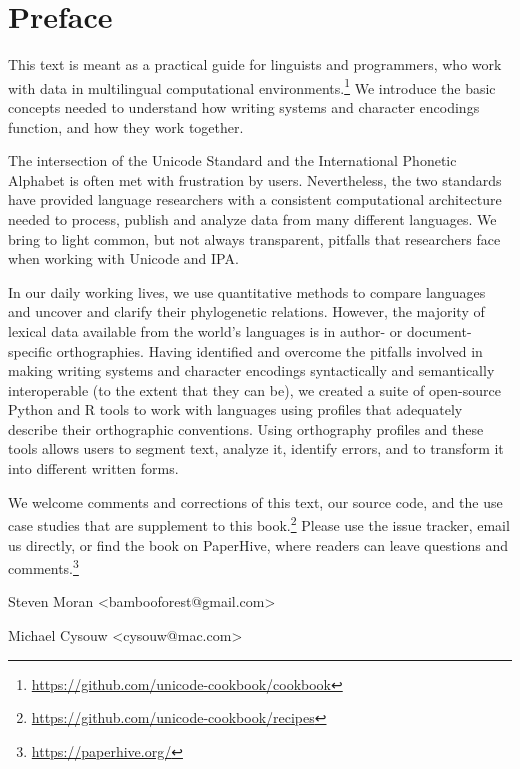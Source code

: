 \chapter{Preface}
\label{preface}

This text is meant as a practical guide for linguists and programmers, who work with data in multilingual computational environments.\footnote{\url{https://github.com/unicode-cookbook/cookbook}} We introduce the basic concepts needed to understand how writing systems and character encodings function, and how they work together.

The intersection of the Unicode Standard and the International Phonetic Alphabet is often met with frustration by users. Nevertheless, the two standards have provided language researchers with a consistent computational architecture needed to process, publish and analyze data from many different languages. We bring to light common, but not always transparent, pitfalls that researchers face when working with Unicode and IPA. 

In our daily working lives, we use quantitative methods to compare languages and uncover and clarify their phylogenetic relations. However, the majority of lexical data available from the world's languages is in author- or document-specific orthographies. Having identified and overcome the pitfalls involved in making writing systems and character encodings syntactically and semantically interoperable (to the extent that they can be), we created a suite of open-source Python and R tools to work with languages using profiles that adequately describe their orthographic conventions. Using orthography profiles and these tools allows users to segment text, analyze it, identify errors, and to transform it into different written forms.

We welcome comments and corrections of this text, our source code, and the use case studies that are supplement to this book.\footnote{\url{https://github.com/unicode-cookbook/recipes}} Please use the issue tracker, email us directly, or find the book on PaperHive, where readers can leave questions and comments.\footnote{\url{https://paperhive.org/}}

\bigbreak
\noindent Steven Moran {\textless}bambooforest@gmail.com{\textgreater}

\noindent Michael Cysouw {\textless}cysouw@mac.com{\textgreater}

